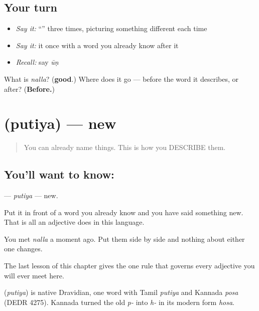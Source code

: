 \subsection*{Your turn}
\begin{itemize}
\raggedright
  \item \emph{Say it:} \textquotedblleft{}\textquotedblright{} three times, picturing something different each time
  \item \emph{Say it:} it once with a word you already know after it
  \item \emph{Recall:} say \emph{ūṇ}
\end{itemize}

\begin{tcolorbox}[breakable,colback=teal!4,colframe=teal!35!black,title={Before you move on}]
What is \emph{nalla}? (\textbf{good}.) Where does it go — before the word it describes, or after? (\textbf{Before.})
\end{tcolorbox}
\section[\texorpdfstring{\ml{പുതിയ} (putiya)}{പുതിയ (putiya)}]{ (putiya) — new}

\label{lesson:ML-C42-new}



\begin{quote}
You can already name things. This is how you DESCRIBE them.
\end{quote}

\subsection*{You'll want to know: }
\textbf{} — \emph{putiya} — new.

Put it in front of a word you already know and you have said something new. That is all an adjective does in this language.

You met \textbf{} \emph{nalla} a moment ago. Put them side by side and nothing about either one changes.

The last lesson of this chapter gives the one rule that governs every adjective you will ever meet here.

\begin{cousinweb}
\textbf{} (\emph{putiya}) is native Dravidian, one word with Tamil \emph{putiya} and Kannada \emph{posa} (DEDR 4275). Kannada turned the old \emph{p-} into \emph{h-} in its modern form \emph{hosa}.
\end{cousinweb}

